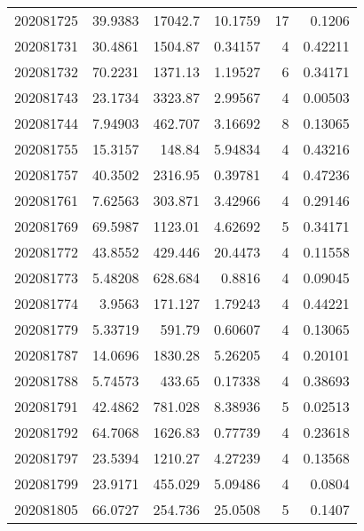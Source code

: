 \begin{tabular}{rrrrrr}
 202081725 &         39.9383  &    17042.7    &           10.1759  &          17 & 0.1206  \\
 202081731 &         30.4861  &     1504.87   &            0.34157 &           4 & 0.42211 \\
 202081732 &         70.2231  &     1371.13   &            1.19527 &           6 & 0.34171 \\
 202081743 &         23.1734  &     3323.87   &            2.99567 &           4 & 0.00503 \\
 202081744 &          7.94903 &      462.707  &            3.16692 &           8 & 0.13065 \\
 202081755 &         15.3157  &      148.84   &            5.94834 &           4 & 0.43216 \\
 202081757 &         40.3502  &     2316.95   &            0.39781 &           4 & 0.47236 \\
 202081761 &          7.62563 &      303.871  &            3.42966 &           4 & 0.29146 \\
 202081769 &         69.5987  &     1123.01   &            4.62692 &           5 & 0.34171 \\
 202081772 &         43.8552  &      429.446  &           20.4473  &           4 & 0.11558 \\
 202081773 &          5.48208 &      628.684  &            0.8816  &           4 & 0.09045 \\
 202081774 &          3.9563  &      171.127  &            1.79243 &           4 & 0.44221 \\
 202081779 &          5.33719 &      591.79   &            0.60607 &           4 & 0.13065 \\
 202081787 &         14.0696  &     1830.28   &            5.26205 &           4 & 0.20101 \\
 202081788 &          5.74573 &      433.65   &            0.17338 &           4 & 0.38693 \\
 202081791 &         42.4862  &      781.028  &            8.38936 &           5 & 0.02513 \\
 202081792 &         64.7068  &     1626.83   &            0.77739 &           4 & 0.23618 \\
 202081797 &         23.5394  &     1210.27   &            4.27239 &           4 & 0.13568 \\
 202081799 &         23.9171  &      455.029  &            5.09486 &           4 & 0.0804  \\
 202081805 &         66.0727  &      254.736  &           25.0508  &           5 & 0.1407  \\

\end{tabular}
